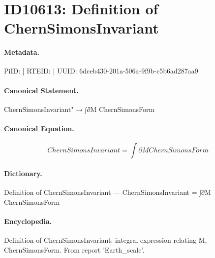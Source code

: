 \section*{ID10613: Definition of ChernSimonsInvariant}
\paragraph{Metadata.}
PiID:  | RTEID:  | UUID: 6dceb430-201a-506a-9f9b-c5b6ad287aa9

\paragraph{Canonical Statement.}
ChernSimonsInvariant" → ∫∂M ChernSimonsForm

\paragraph{Canonical Equation.}
\[
ChernSimonsInvariant = ∫∂M ChernSimonsForm
\]

\paragraph{Dictionary.}
Definition of ChernSimonsInvariant — ChernSimonsInvariant = ∫∂M ChernSimonsForm

\paragraph{Encyclopedia.}
Definition of ChernSimonsInvariant: integral expression relating M, ChernSimonsForm. From report 'Earth\_scale'.
